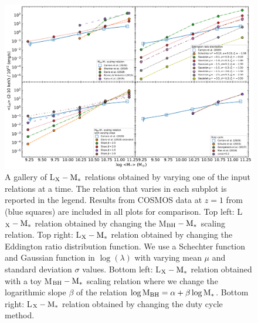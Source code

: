 \begin{figure}
\begin{center}
  \includegraphics[width=\textwidth]{Figs/Chapter3/fig2_z1.0.pdf}
  \caption{A gallery of L$_{\rm X}-{\rm M}_*$ relations obtained by varying one of the input relations at a time. The relation that varies in each subplot is reported in the legend. 
  Results from COSMOS data at $z=1$ from  \citet{2020A&A...642A..65C} (blue squares) are included in all plots for comparison.
  Top left: L$_{\rm X}-{\rm M}_*$ relation obtained by changing the M$_{\rm BH}-{\rm M}_*$ scaling relation.
  Top right: L$_{\rm X}-{\rm M}_*$ relation obtained by changing the Eddington ratio distribution function. We use a Schechter function and Gaussian function in $\log(\lambda)$ with varying mean $\mu$ and standard deviation $\sigma$ values.
  Bottom left: L$_{\rm X}-{\rm M}_*$ relation obtained with a toy M$_{\rm BH}-{\rm M}_*$ scaling relation where we change the logarithmic slope $\beta$ of the relation $\log {\rm M}_{\rm BH} = \alpha + \beta \log {\rm M}_*$.
  Bottom right: L$_{\rm X}-{\rm M}_*$ relation obtained by changing the duty cycle method. %
  }
    \label{fig:LX_M}
\end{center}
\end{figure}

